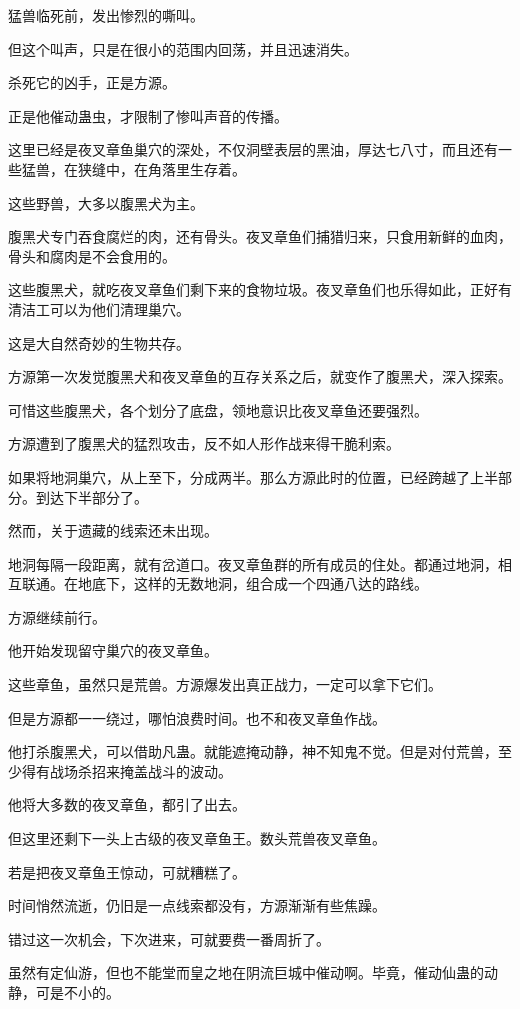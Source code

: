 \begin{this_body}
猛兽临死前，发出惨烈的嘶叫。

但这个叫声，只是在很小的范围内回荡，并且迅速消失。

杀死它的凶手，正是方源。

正是他催动蛊虫，才限制了惨叫声音的传播。

这里已经是夜叉章鱼巢穴的深处，不仅洞壁表层的黑油，厚达七八寸，而且还有一些猛兽，在狭缝中，在角落里生存着。

这些野兽，大多以腹黑犬为主。

腹黑犬专门吞食腐烂的肉，还有骨头。夜叉章鱼们捕猎归来，只食用新鲜的血肉，骨头和腐肉是不会食用的。

这些腹黑犬，就吃夜叉章鱼们剩下来的食物垃圾。夜叉章鱼们也乐得如此，正好有清洁工可以为他们清理巢穴。

这是大自然奇妙的生物共存。

方源第一次发觉腹黑犬和夜叉章鱼的互存关系之后，就变作了腹黑犬，深入探索。

可惜这些腹黑犬，各个划分了底盘，领地意识比夜叉章鱼还要强烈。

方源遭到了腹黑犬的猛烈攻击，反不如人形作战来得干脆利索。

如果将地洞巢穴，从上至下，分成两半。那么方源此时的位置，已经跨越了上半部分。到达下半部分了。

然而，关于遗藏的线索还未出现。

地洞每隔一段距离，就有岔道口。夜叉章鱼群的所有成员的住处。都通过地洞，相互联通。在地底下，这样的无数地洞，组合成一个四通八达的路线。

方源继续前行。

他开始发现留守巢穴的夜叉章鱼。

这些章鱼，虽然只是荒兽。方源爆发出真正战力，一定可以拿下它们。

但是方源都一一绕过，哪怕浪费时间。也不和夜叉章鱼作战。

他打杀腹黑犬，可以借助凡蛊。就能遮掩动静，神不知鬼不觉。但是对付荒兽，至少得有战场杀招来掩盖战斗的波动。

他将大多数的夜叉章鱼，都引了出去。

但这里还剩下一头上古级的夜叉章鱼王。数头荒兽夜叉章鱼。

若是把夜叉章鱼王惊动，可就糟糕了。

时间悄然流逝，仍旧是一点线索都没有，方源渐渐有些焦躁。

错过这一次机会，下次进来，可就要费一番周折了。

虽然有定仙游，但也不能堂而皇之地在阴流巨城中催动啊。毕竟，催动仙蛊的动静，可是不小的。


\end{this_body}
